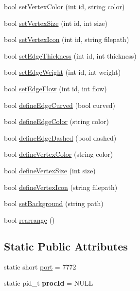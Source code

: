\begin{DoxyCompactItemize}
\item 
bool \hyperlink{class_graph_viewer_a8b542d7e09e81a45a74760c19233beb0}{set\+Vertex\+Color} (int id, string color)
\item 
bool \hyperlink{class_graph_viewer_ae930dfdfcdeb7a871eefb6028d74b9f9}{set\+Vertex\+Size} (int id, int size)
\item 
bool \hyperlink{class_graph_viewer_a02d5f7393eab9a2d1b66719039597a64}{set\+Vertex\+Icon} (int id, string filepath)
\item 
bool \hyperlink{class_graph_viewer_a07f598272fe3515455eab13be749604a}{set\+Edge\+Thickness} (int id, int thickness)
\item 
bool \hyperlink{class_graph_viewer_ac211de009a0afe2e6d44f4f8d030a2cc}{set\+Edge\+Weight} (int id, int weight)
\item 
bool \hyperlink{class_graph_viewer_a69eb065145063e4dea41961e92e35c8e}{set\+Edge\+Flow} (int id, int flow)
\item 
bool \hyperlink{class_graph_viewer_a08f362be0e682d91e7506dca8caae1b8}{define\+Edge\+Curved} (bool curved)
\item 
bool \hyperlink{class_graph_viewer_a4102580b69826ba83251ef7bb262f8be}{define\+Edge\+Color} (string color)
\item 
bool \hyperlink{class_graph_viewer_af785279b5c204df0e274b20c36276fc3}{define\+Edge\+Dashed} (bool dashed)
\item 
bool \hyperlink{class_graph_viewer_a76de8676b7a93d72af514b84cdaa4d21}{define\+Vertex\+Color} (string color)
\item 
bool \hyperlink{class_graph_viewer_ac4b2a9fec74d38e64088aa79ca4b7d9b}{define\+Vertex\+Size} (int size)
\item 
bool \hyperlink{class_graph_viewer_af1adb6a361457187a820e01dcf0a34b7}{define\+Vertex\+Icon} (string filepath)
\item 
bool \hyperlink{class_graph_viewer_a02437b5fecd8b90de24436068312d593}{set\+Background} (string path)
\item 
bool \hyperlink{class_graph_viewer_a3009a66958686ccb7e78b68e37c3c423}{rearrange} ()
\end{DoxyCompactItemize}
\subsection*{Static Public Attributes}
\begin{DoxyCompactItemize}
\item 
static short \hyperlink{class_graph_viewer_a89d0abe75f41feededc49497cc514342}{port} = 7772
\item 
\hypertarget{class_graph_viewer_aeab74c57a4b672384f484884c000c692}{}\label{class_graph_viewer_aeab74c57a4b672384f484884c000c692} 
static pid\+\_\+t {\bfseries proc\+Id} = N\+U\+LL
\end{DoxyCompactItemize}


